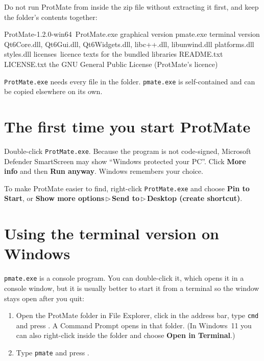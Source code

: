 \documentclass[11pt,a4paper,oneside]{report}
\newcommand{\cmd}[1]{\texttt{#1}}            %
\newcommand{\key}[1]{\fbox{\footnotesize\textsf{#1}}}
\newcommand{\gui}[1]{\textsf{\textbf{#1}}}  %
\begin{document}
Do not run ProtMate from inside the zip file without extracting it first, and keep the folder's
contents together:

\begin{listing}
ProtMate-1.2.0-win64\
    ProtMate.exe           graphical version
    pmate.exe              terminal version
    Qt6Core.dll, Qt6Gui.dll, Qt6Widgets.dll, libc++.dll, libunwind.dll
    platforms\qwindows.dll
    styles\qmodernwindowsstyle.dll
    licenses\              licence texts for the bundled libraries
    README.txt
    LICENSE.txt            the GNU General Public License (ProtMate's licence)
\end{listing}

\cmd{ProtMate.exe} needs every file in the folder. \cmd{pmate.exe} is self-contained and can be
copied elsewhere on its own.

\section{The first time you start ProtMate}

Double-click \cmd{ProtMate.exe}. Because the program is not code-signed, Microsoft Defender
SmartScreen may show ``Windows protected your PC''. Click \gui{More info} and then
\gui{Run anyway}. Windows remembers your choice.

To make ProtMate easier to find, right-click \cmd{ProtMate.exe} and choose \gui{Pin to Start}, or
\gui{Show more options}\,$\triangleright$\,\gui{Send to}\,$\triangleright$\,\gui{Desktop (create shortcut)}.

\section{Using the terminal version on Windows}

\cmd{pmate.exe} is a console program. You can double-click it, which opens it in a console window,
but it is usually better to start it from a terminal so the window stays open after you quit:

\begin{enumerate}
  \item Open the ProtMate folder in File Explorer, click in the address bar, type \cmd{cmd} and
        press \key{Enter}. A Command Prompt opens in that folder. (In Windows~11 you can also
        right-click inside the folder and choose \gui{Open in Terminal}.)
  \item Type \cmd{pmate} and press \key{Enter}.
\end{enumerate}
\end{document}
